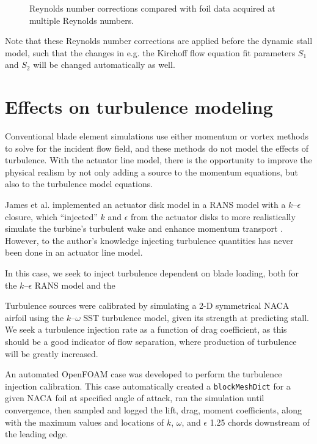 \begin{figure}
\caption{Reynolds number corrections compared with foil data acquired at
multiple Reynolds numbers.}
\label{fig:Re-corrections}
\end{figure}

Note that these Reynolds number corrections are applied before the dynamic stall
model, such that the changes in e.g. the Kirchoff flow equation fit parameters
$S_1$ and $S_2$ will be changed automatically as well.


\section{Effects on turbulence modeling}

Conventional blade element simulations use either momentum or vortex methods to
solve for the incident flow field, and these methods do not model the effects of
turbulence. With the actuator line model, there is the opportunity to improve
the physical realism by not only adding a source to the momentum equations, but
also to the turbulence model equations.

James et al. implemented an actuator disk model in a RANS model with a
$k$--$\epsilon$ closure, which ``injected'' $k$ and $\epsilon$ from the actuator
disks to more realistically simulate the turbine's turbulent wake and enhance
momentum transport \cite{James2010}. However, to the author's knowledge
injecting turbulence quantities has never been done in an actuator line model.

In this case, we seek to inject turbulence dependent on blade loading, both
for the $k$--$\epsilon$ RANS model and the

Turbulence sources were calibrated by simulating a 2-D symmetrical NACA airfoil
using the $k$--$\omega$ SST turbulence model, given its strength at predicting
stall. We seek a turbulence injection rate as a function of drag coefficient, as
this should be a good indicator of flow separation, where production of
turbulence will be greatly increased.

An automated OpenFOAM case was developed to perform the turbulence injection
calibration. This case automatically created a \texttt{blockMeshDict} for a
given NACA foil at specified angle of attack, ran the simulation until
convergence, then sampled and logged the lift, drag, moment coefficients, along
with the maximum values and locations of $k$, $\omega$, and $\epsilon$ 1.25
chords downstream of the leading edge.

